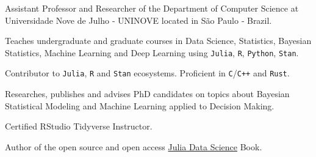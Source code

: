 \vspace{0.25cm}

\begin{cvitems}

  \item Assistant Professor and Researcher of the Department of Computer Science at Universidade Nove de Julho ‑
  UNINOVE located in São Paulo ‑ Brazil.
  \item Teaches undergraduate and graduate courses in Data Science, Statistics, Bayesian Statistics,
  Machine Learning and Deep Learning using \texttt{Julia}, \texttt{R}, \texttt{Python}, \texttt{Stan}.
  \item Contributor to \texttt{Julia}, \texttt{R} and \texttt{Stan} ecosystems. Proficient in \texttt{C}/\texttt{C++} and \texttt{Rust}.
  \item Researches, publishes and advises PhD candidates on topics about Bayesian Statistical Modeling and Machine
  Learning applied to Decision Making.
  \item Certified RStudio Tidyverse Instructor.
  \item Author of the open source and open access \href{https://juliadatascience.io}{Julia Data Science} Book.

\end{cvitems}

